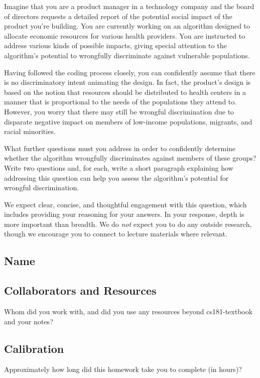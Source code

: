 \documentclass[submit]{harvardml}
\begin{document}
\newpage
\begin{problem}
Imagine that you are a product manager in a technology company and the board of directors requests a detailed report of the potential social impact of the product you're building. You are currently working on an algorithm designed to allocate economic resources for various health providers. You are instructed to address various kinds of possible impacts, giving special attention to the algorithm’s potential to wrongfully discriminate against vulnerable populations. 

Having followed the coding process closely, you can confidently assume that there is no discriminatory intent animating the design.  In fact, the product’s design is based on the notion that resources should be distributed to health centers in a manner that is proportional to the needs of the populations they attend to. However, you worry that there may still be wrongful discrimination due to disparate negative impact on members of low-income populations, migrants, and racial minorities. 

What further questions must you address in order to confidently determine whether the algorithm wrongfully discriminates against members of these groups? Write two questions and, for each, write a short paragraph explaining how addressing this question can help you assess the algorithm’s potential for wrongful discrimination.


We expect clear, concise, and thoughtful engagement with this question, which includes providing your reasoning for your answers.  In your response, depth is more important than breadth. We do \emph{not} expect you to do any outside research, though we encourage you to connect to lecture materials where relevant.

\end{problem}


\newpage
\subsection*{Name}

\subsection*{Collaborators and Resources}
Whom did you work with, and did you use any resources beyond cs181-textbook and your notes?

\subsection*{Calibration}
Approximately how long did this homework take you to complete (in hours)? 
\end{document}
